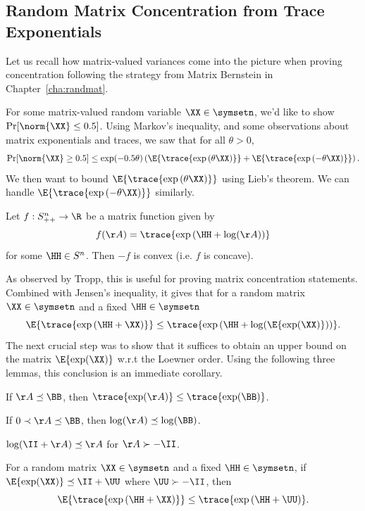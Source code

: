 \subsection{Random Matrix Concentration from Trace Exponentials}
Let us recall how matrix-valued variances come into the picture when
proving concentration following the strategy from Matrix Bernstein in
Chapter~\ref{cha:randmat}.

For some matrix-valued random variable $\XX \in \symsetn$,
we'd like to show $\Pr[ \norm{\XX} \leq 0.5 ]$.
Using Markov's inequality, and some observations about matrix
exponentials and traces, we saw that for all $\theta > 0$,
\begin{equation}
  \label{eq:masterprob}
  \Pr[ \norm{\XX} \geq 0.5 ]
  \leq
  \exp(-0.5\theta ) \left(\E{\trace{ \exp\left(\theta \XX\right)}}
  +
  \E{\trace{ \exp\left(-\theta \XX\right)}}
  \right)
  .
\end{equation}
We then want to bound $\E{\trace{ \exp\left(\theta \XX\right)}}$
using Lieb's theorem.
We can handle $\E{\trace{ \exp\left(-\theta \XX\right)}}$ similarly.
\begin{theorem}[Lieb]
  \label{thm:liebagain}
  Let $f:S^n_{++}\to\R$ be a matrix function given by
  \[ f(\AA) = \trace{\exp\left(\HH+\log(\AA)\right)} \]
  for some $\HH\in S^n$. Then $-f$ is convex (i.e. $f$ is concave).
\end{theorem}
As observed by Tropp, this is useful for proving matrix concentration statements.
Combined with Jensen's inequality, it gives that for a random matrix
$\XX \in \symsetn $ and a fixed $\HH \in \symsetn$
\[
  \E{\trace{ \exp\left(\HH+\XX\right)}}
    \leq
    \trace{ \exp\left(\HH+\log(\E{\exp(\XX)})\right)}
  .
\]
The next crucial step was to show that it suffices to obtain an upper
bound on the matrix $\E{\exp(\XX)}$ w.r.t the Loewner order.
Using the following three lemmas, this conclusion is an immediate
corollary.
\begin{lemma}\label{lem:trexpmono}
  If $\AA\preceq\BB$, then $\trace{\exp(\AA)}\leq\trace{\exp(\BB)}$.
\end{lemma}
\begin{lemma}
  If $0\prec\AA\preceq\BB$, then $\log(\AA)\preceq\log(\BB)$.
\end{lemma}
\begin{lemma}\label{lem:ineq_logagain}
  $\log(\II+\AA) \preceq \AA$ for $\AA\succ-\II$.
\end{lemma}
%
\begin{corollary}
  \label{cor:trexpub}
  For a random matrix
  $\XX \in \symsetn $ and a fixed $\HH \in \symsetn$,
  if $\E{\exp(\XX)} \preceq \II + \UU$ where $\UU \succ -\II$, then
\[
  \E{\trace{ \exp\left(\HH+\XX\right)}}
    \leq
    \trace{ \exp\left(\HH+\UU\right)}
  .
\]
\end{corollary}

